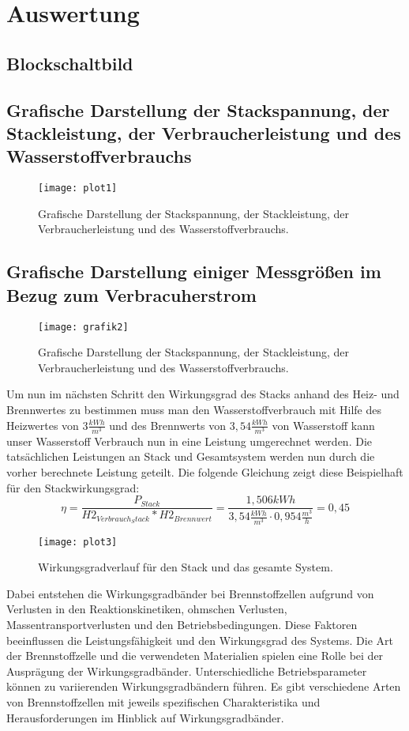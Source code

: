 \section{Auswertung}
\label{sec:Auswertung}


\subsection{Blockschaltbild}
\subsection{Grafische Darstellung der Stackspannung, der
Stackleistung, der Verbraucherleistung und des Wasserstoffverbrauchs}
\begin{figure}[H]
    \centering
    \texttt{[image: plot1]}
    \caption{Grafische Darstellung der Stackspannung, der
    Stackleistung, der Verbraucherleistung und des Wasserstoffverbrauchs.}
    \label{fig:plot1_26062023}
  \end{figure}
\subsection{Grafische Darstellung einiger Messgrößen im Bezug zum Verbracuherstrom}
\begin{figure}[H]
    \centering
    \texttt{[image: grafik2]}
    \caption{Grafische Darstellung der Stackspannung, der
    Stackleistung, der Verbraucherleistung und des Wasserstoffverbrauchs.}
    \label{fig:plot2_26062023}
  \end{figure}
  Um nun im nächsten Schritt den Wirkungsgrad des Stacks anhand des Heiz- und Brennwertes zu bestimmen muss man den Wasserstoffverbrauch mit Hilfe des Heizwertes von $3 \frac{kWh}{m^3}$ und des Brennwerts von $3,54 \frac{kWh}{m^3}$
von Wasserstoff kann unser Wasserstoff Verbrauch nun in eine Leistung umgerechnet werden. Die tatsächlichen Leistungen an Stack und Gesamtsystem werden nun durch die vorher berechnete Leistung geteilt. Die folgende Gleichung zeigt diese Beispielhaft für den Stackwirkungsgrad:
\begin{equation}
 \eta= \frac{P_{Stack}}{H2_{Verbrauch_Stack}*H2_{Brennwert}}= \frac{1,506 kWh}{3,54 \frac{kWh}{m^3 }\cdot 0,954 \frac{m^3}{h}}=0,45
  \label{eq:230627_Beispiel_wirkungsgrad_Berechnung}
\end{equation}
\begin{figure}[H]
    \centering
    \texttt{[image: plot3]}
    \caption{Wirkungsgradverlauf für den Stack und das gesamte System.}
    \label{fig:plot3_26062023}
  \end{figure}
  Dabei entstehen die Wirkungsgradbänder bei Brennstoffzellen aufgrund von Verlusten in den Reaktionskinetiken, ohmschen Verlusten, Massentransportverlusten und den Betriebsbedingungen. Diese Faktoren beeinflussen die Leistungsfähigkeit und den Wirkungsgrad des Systems.
   Die Art der Brennstoffzelle und die verwendeten Materialien spielen eine Rolle bei der Ausprägung der Wirkungsgradbänder. Unterschiedliche Betriebsparameter können zu variierenden Wirkungsgradbändern führen. Es gibt verschiedene Arten von Brennstoffzellen mit jeweils spezifischen Charakteristika und Herausforderungen im Hinblick auf Wirkungsgradbänder.
